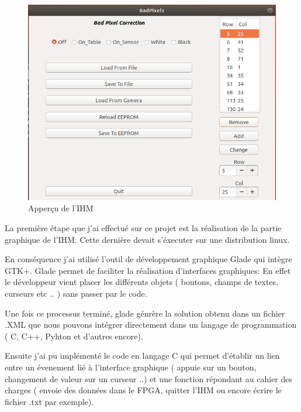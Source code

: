 \begin{figure}[ht]
    \centering
    \includegraphics[scale=0.45]{img/IHM.png}
    \caption{Apperçu de l'IHM}
    \label{fig:CameraCmdsettings}
\end{figure}


La première étape que j'ai effectué sur ce projet est la réalisation de la partie graphique de l'IHM. Cette dernière devait s'éxecuter sur une distribution linux.

En conséquence j'ai utilisé l'outil de développement graphique Glade qui intègre GTK+. Glade permet de faciliter la réalisation d'interfaces graphiques: En effet le développeur vient placer les différents objets ( boutons, champs de textes, curseurs etc .. ) sans passer par le code. 

Une fois ce processus terminé, glade génrère la solution obtenu dans un fichier .XML que nous pouvons intégrer directement dans un langage de programmation ( C, C++, Pyhton et d'autres encore). 
\newline


Ensuite j'ai pu implémenté le code en langage C qui permet d'établir un lien entre un évenement lié à l'interface graphique ( appuie sur un bouton, changement de valeur sur un curseur ..) et une fonction répondant au cahier des charges ( envoie des données dans le FPGA, quitter l'IHM ou encore écrire le fichier .txt par exemple). 



